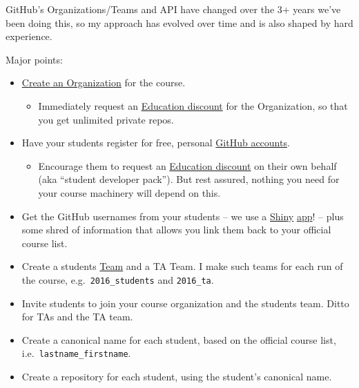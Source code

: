 \documentclass[
]{book}
\providecommand{\tightlist}{%
  \setlength{\itemsep}{0pt}\setlength{\parskip}{0pt}}
\begin{document}
GitHub's Organizations/Teams and API have changed over the 3+ years we've been doing this, so my approach has evolved over time and is also shaped by hard experience.

Major points:

\begin{itemize}
\tightlist
\item
  \href{https://help.github.com/articles/creating-a-new-organization-account/}{Create an Organization} for the course.

  \begin{itemize}
  \tightlist
  \item
    Immediately request an \href{https://education.github.com}{Education discount} for the Organization, so that you get unlimited private repos.
  \end{itemize}
\item
  Have your students register for free, personal \href{https://github.com}{GitHub accounts}.

  \begin{itemize}
  \tightlist
  \item
    Encourage them to request an \href{https://education.github.com}{Education discount} on their own behalf (aka ``student developer pack''). But rest assured, nothing you need for your course machinery will depend on this.
  \end{itemize}
\item
  Get the GitHub usernames from your students -- we use a \href{http://deanattali.com/blog/shiny-persistent-data-storage/}{Shiny} \href{http://deanattali.com/2015/06/14/mimicking-google-form-shiny/}{app}! -- plus some shred of information that allows you link them back to your official course list.
\item
  Create a students \href{https://help.github.com/enterprise/2.7/admin/guides/user-management/organizations-and-teams/}{Team} and a TA Team. I make such teams for each run of the course, e.g.~\texttt{2016\_students} and \texttt{2016\_ta}.
\item
  Invite students to join your course organization and the students team. Ditto for TAs and the TA team.
\item
  Create a canonical name for each student, based on the official course list, i.e.~\texttt{lastname\_firstname}.
\item
  Create a repository for each student, using the student's canonical name.


\end{itemize}
\end{document}
